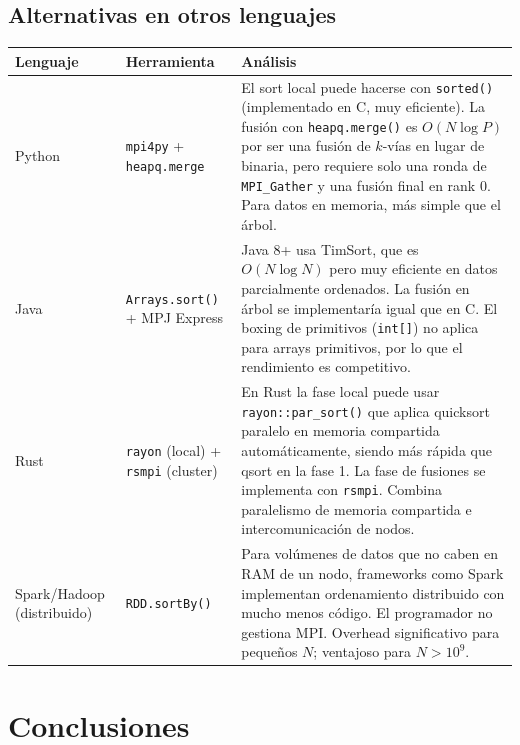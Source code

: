\documentclass[12pt,a4paper]{article}
\begin{document}
\subsection{Alternativas en otros lenguajes}

\begin{longtable}{L{2.5cm} L{3.5cm} L{7.5cm}}
\toprule
\textbf{Lenguaje} & \textbf{Herramienta} & \textbf{Análisis} \\
\midrule
\endhead
Python & \texttt{mpi4py} + \texttt{heapq.merge} & El sort local puede hacerse con
  \texttt{sorted()} (implementado en C, muy eficiente). La fusión con
  \texttt{heapq.merge()} es $O(N \log P)$ por ser una fusión de $k$-vías en
  lugar de binaria, pero requiere solo una ronda de \texttt{MPI\_Gather} y
  una fusión final en rank 0. Para datos en memoria, más simple que el árbol. \\[4pt]
Java & \texttt{Arrays.sort()} + MPJ Express & Java 8+ usa TimSort, que es
  $O(N \log N)$ pero muy eficiente en datos parcialmente ordenados. La
  fusión en árbol se implementaría igual que en C. El boxing de primitivos
  (\texttt{int[]}) no aplica para arrays primitivos, por lo que el rendimiento
  es competitivo. \\[4pt]
Rust & \texttt{rayon} (local) + \texttt{rsmpi} (cluster) & En Rust la fase local
  puede usar \texttt{rayon::par\_sort()} que aplica quicksort paralelo en memoria
  compartida automáticamente, siendo más rápida que qsort en la fase 1. La
  fase de fusiones se implementa con \texttt{rsmpi}. Combina paralelismo de
  memoria compartida e intercomunicación de nodos. \\[4pt]
Spark/Hadoop (distribuido) & \texttt{RDD.sortBy()} & Para volúmenes de datos que
  no caben en RAM de un nodo, frameworks como Spark implementan ordenamiento
  distribuido con mucho menos código. El programador no gestiona MPI.
  Overhead significativo para pequeños $N$; ventajoso para $N > 10^9$. \\
\bottomrule
\end{longtable}

\newpage

\section*{Conclusiones}
\end{document}
